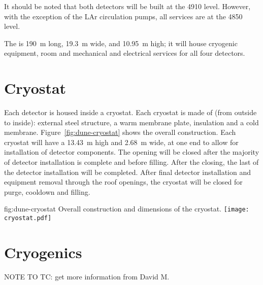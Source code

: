 It should be noted that both detectors will be built at the 4910
level. However, with the exception of the LAr circulation pumps, all
services are at the 4850 level.

The  is \SI{190}{\meter} long, \SI{19.3}{\meter}
wide, and \SI{10.95}{\meter} high; it will house cryogenic equipment, 
room and mechanical and electrical services for all four
detectors.

\section{Cryostat}
\label{sec:fdsp-coord-cryostat}

Each detector is housed inside a cryostat. Each cryostat is made of
(from outside to inside): external steel structure, a warm membrane
plate, insulation and a cold membrane. Figure~\ref{fig:dune-cryostat}
shows the overall construction. Each cryostat will have a
 \SI{13.43}{\meter} high and \SI{2.68}{\meter}
wide, at one end to allow for installation of detector components. The
opening will be closed after the majority of detector installation is
complete and before filling. After the  closing, the last of the
detector installation will be completed. After final detector
installation and equipment removal through the roof openings, the
cryostat will be closed for purge, cooldown and filling.
\begin{dunefigure}{fig:dune-cryostat}
  {Overall construction and dimensions of the  cryostat.}
  \texttt{[image: cryostat.pdf]}
\end{dunefigure}

\section{Cryogenics}
\label{sec:fdsp-coord-cryogenics}

NOTE TO TC: get more information from David M.


